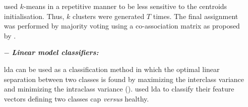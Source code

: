 \begin{enumerate}[leftmargin=*]
\cite{Tiwari2008,Viswanath2008,Viswanath2008a} used $k$-means in a repetitive manner to be less sensitive to the centroids initialisation. Thus, $k$ clusters were generated $T$ times. The final assignment was performed by majority voting using a co-association matrix as proposed by \cite{Fred2005}.

\item[$-$] \textbf{\textit{Linear model classifiers:}} 

\Acf{lda} can be used as a classification method in which the optimal linear separation between two classes is found by maximizing the interclass variance and minimizing the intraclass variance (\cite{Friedman1989}). %
%
%
%
%
\cite{Antic2013,Chan2003,Litjens2014,Niaf2011,Niaf2012,Vos2012} used \ac{lda} to classify their feature vectors defining two classes \ac{cap} \textit{versus} healthy.


\end{enumerate}
